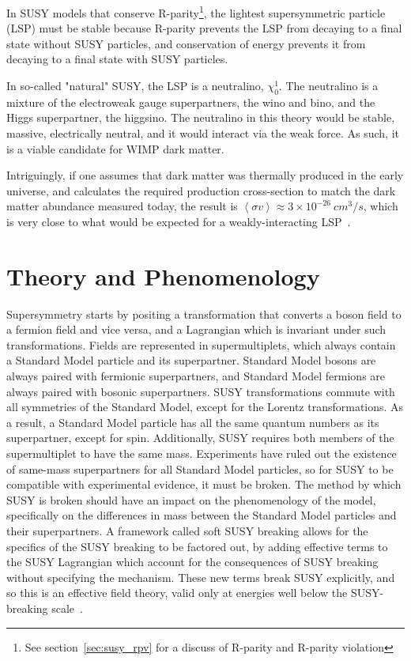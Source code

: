 In SUSY models that conserve R-parity\footnote{See section~\ref{sec:susy_rpv} for a discuss of R-parity and R-parity violation}, the lightest supersymmetric particle (LSP) must be stable because R-parity prevents the LSP from decaying to a final state without SUSY particles, and conservation of energy prevents it from decaying to a final state with SUSY particles.

In so-called "natural" SUSY, the LSP is a neutralino, $\chi_0^{1}$.
The neutralino is a mixture of the electroweak gauge superpartners, the wino and bino, and the Higgs superpartner, the higgsino.
The neutralino in this theory would be stable, massive, electrically neutral, and it would interact via the weak force.
As such, it is a viable candidate for WIMP dark matter.

Intriguingly, if one assumes that dark matter was thermally produced in the early universe,
and calculates the required production cross-section to match the dark matter abundance measured today,
the result is $\left<\sigma v\right> \approx 3 \times 10^{-26}~cm^{3}/s$,
which is very close to what would be expected for a weakly-interacting LSP~\cite{susy-dark-matter-1996}.

\section{Theory and Phenomenology}\label{sec:susy_theory}

Supersymmetry starts by positing a transformation that converts a boson field to a fermion field and vice versa,
and a Lagrangian which is invariant under such transformations.
Fields are represented in supermultiplets, which always contain a Standard Model particle and its superpartner.
Standard Model bosons are always paired with fermionic superpartners,
and Standard Model fermions are always paired with bosonic superpartners.
SUSY transformations commute with all symmetries of the Standard Model, except for the Lorentz transformations.
As a result, a Standard Model particle has all the same quantum numbers as its superpartner, except for spin.
Additionally, SUSY requires both members of the supermultiplet to have the same mass.
Experiments have ruled out the existence of same-mass superpartners for all Standard Model particles,
so for SUSY to be compatible with experimental evidence, it must be broken.
The method by which SUSY is broken should have an impact on the phenomenology of the model,
specifically on the differences in mass between the Standard Model particles and their superpartners.
A framework called soft SUSY breaking allows for the specifics of the SUSY breaking to be factored out,
by adding effective terms to the SUSY Lagrangian which account for the consequences of SUSY breaking without specifying the mechanism.
These new terms break SUSY explicitly, and so this is an effective field theory, valid only at energies well below the
SUSY-breaking scale~\cite{susy-soft-1981}.

